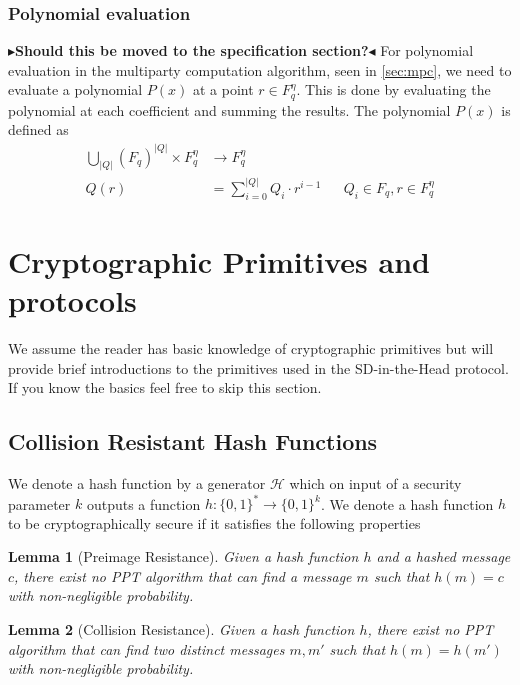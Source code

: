\documentclass[twoside,11pt,openright]{report}
\theoremstyle{definition}
\theoremstyle{plain}
\newtheorem{lemma}{Lemma}[section]
\newcommand{\todo}[1]{{\color[rgb]{.5,0,0}\textbf{$\blacktriangleright$#1$\blacktriangleleft$}}}
\begin{document}
\subsubsection{Polynomial evaluation}
\todo{Should this be moved to the specification section?}
For polynomial evaluation in the multiparty computation algorithm, seen in \autoref{sec:mpc}, we need to evaluate a polynomial $P(x)$ at a point $r \in F_q^\eta$. This is done by evaluating the polynomial at each coefficient and summing the results. The polynomial $P(x)$ is defined as
\begin{align}
  \textstyle\bigcup_{|Q|}(F_q)^{|Q|} \times F_q^\eta & \rightarrow F_q^\eta                 \nonumber                                  \\
  Q(r)                                               & = \textstyle\sum_{i=0}^{|Q|} Q_i \cdot r^{i-1} &  & Q_i \in F_q, r \in F_q^\eta
  \label{eq:mpcpoly}
\end{align}

\section{Cryptographic Primitives and protocols}
We assume the reader has basic knowledge of cryptographic primitives but will provide brief introductions to the primitives used in the SD-in-the-Head protocol. If you know the basics feel free to skip this section.

\subsection{Collision Resistant Hash Functions}
We denote a hash function by a generator $\mathcal{H}$ which on input of a security parameter $k$ outputs a function $h : \{0,1\}^* \rightarrow \{0,1\}^k$. We denote a hash function $h$ to be cryptographically secure if it satisfies the following properties

\begin{lemma}[Preimage Resistance]
  \label{lem:preimage}
  Given a hash function $h$ and a hashed message $c$, there exist no PPT algorithm that can find a message $m$ such that $h(m) = c$ with non-negligible probability.
\end{lemma}

\begin{lemma}[Collision Resistance]\label{lem:collision}
  Given a hash function $h$, there exist no PPT algorithm that can find two distinct messages $m, m'$ such that $h(m) = h(m')$ with non-negligible probability.
\end{lemma}
\end{document}
